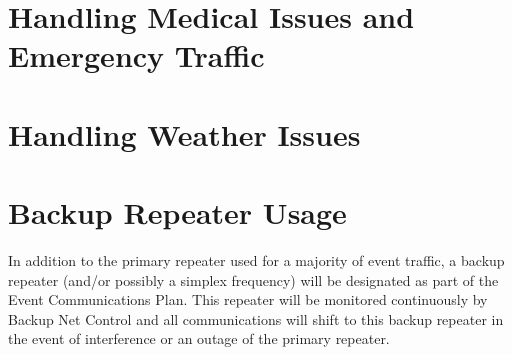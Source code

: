 \documentclass[pdflatex,letterpaper,twoside,12pt]{book}
\begin{document}

\section{Handling Medical Issues and Emergency Traffic}

\iffalse %
We want to change emergencies.. No longer will we hold traffic for nets. We need 
to get back to the "Break Break" for emergency traffic, which then we hold only 
for the traffic, not until the ER is rectified. We need to work  HARD on getting 
Medical onto their own freq. and allowing logistics to handle the ER Dispatch, 
etc. We will be having a meeting in January with Leisha and Dave Polaski in 
regards. Wold like you to be there also. More to come here as we get closer, but 
Were taking control and selling the idea direct to Dave to get his buy in and 
push on Dennis. no more Dennis pushing us around. They need to do their job too!
\fi %


\section{Handling Weather Issues}

\iffalse %
 * Clearly define process or criteria in which we begin collecting or
   disseminating weather data? 
\fi %


\section{Backup Repeater Usage}

In addition to the primary repeater used for a majority of event traffic, a backup repeater (and/or possibly a simplex frequency) will be designated as part of the Event Communications Plan.  This repeater will be monitored continuously by Backup Net Control and all communications will shift to this backup repeater in the event of interference or an outage of the primary repeater.
\end{document}
